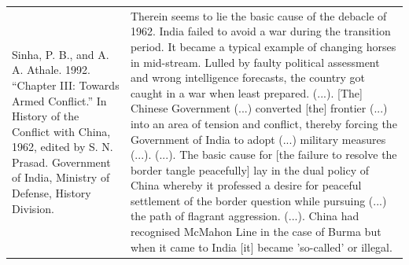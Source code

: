 {\begin{longtable}{p{}p{}}
\\
Sinha, P. B., and A. A. Athale. 1992. “Chapter III: Towards Armed Conflict.” In History of the Conflict with China, 1962, edited by S. N. Prasad. Government of India, Ministry of Defense, History Division. & Therein seems to lie the basic cause of the debacle of 1962. India failed to avoid a war during the transition period. It became a typical example of changing horses in mid-stream. Lulled by faulty political assessment and wrong intelligence forecasts, the country got caught in a war when least prepared. (...).  [The] Chinese Government (...) converted [the] frontier (...) into an area of tension and conflict, thereby forcing the Government of India to adopt (...) military measures (...). (...). The basic cause for [the failure to resolve the border tangle peacefully] lay in the dual policy of China whereby it professed a desire for peaceful settlement of the border question while pursuing (...) the path of flagrant aggression. (...). China had recognised McMahon Line in the case of Burma but when it came to India [it] became  'so-called' or illegal.


\end{longtable}}
